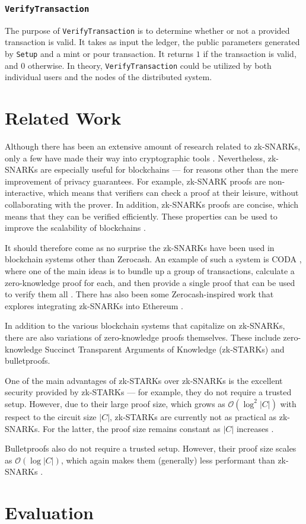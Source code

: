 \documentclass{article}
\begin{document}
\subsubsection{\texttt{VerifyTransaction}}
The purpose of \texttt{VerifyTransaction} is to determine whether or not a provided transaction is valid. It takes as input the ledger, the public parameters generated by \texttt{Setup} and a mint or pour transaction. It returns $1$ if the transaction is valid, and $0$ otherwise. In theory, \texttt{VerifyTransaction} could be utilized by both individual users and the nodes of the distributed system.

\section{Related Work}
Although there has been an extensive amount of research related to zk-SNARKs, only a few have made their way into cryptographic tools \cite{zk-snarks-blockchains-chapter}. Nevertheless, zk-SNARKs are especially useful for blockchains --- for reasons other than the mere improvement of privacy guarantees. For example, zk-SNARK proofs are non-interactive, which means that verifiers can check a proof at their leisure, without collaborating with the prover. In addition, zk-SNARKs proofs are concise, which means that they can be verified efficiently. These properties can be used to improve the scalability of blockchains \cite{zk-snarks-blockchains-chapter}.

It should therefore come as no surprise the zk-SNARKs have been used in blockchain systems other than Zerocash. An example of such a system is CODA \cite{coda}, where one of the main ideas is to bundle up a group of transactions, calculate a zero-knowledge proof for each, and then provide a single proof that can be used to verify them all \cite{zk-snarks-blockchains-chapter}. There has also been some Zerocash-inspired work that explores integrating zk-SNARKs into Ethereum \cite{zeth}.

In addition to the various blockchain systems that capitalize on zk-SNARKs, there are also variations of zero-knowledge proofs themselves. These include zero-knowledge Succinct Transparent Arguments of Knowledge (zk-STARKs) and bulletproofs.

One of the main advantages of zk-STARKs over zk-SNARKs is the excellent security provided by zk-STARKs --- for example, they do not require a trusted setup. However, due to their large proof size, which grows as $\mathcal{O}(\log^ 2{|C|})$ with respect to the circuit size $|C|$, zk-STARKs are currently not as practical as zk-SNARKs. For the latter, the proof size remains constant as $|C|$ increases \cite{zk-snarks-blockchains-chapter}.

Bulletproofs also do not require a trusted setup. However, their proof size scales as $\mathcal{O}(\log{|C|})$, which again makes them (generally) less performant than zk-SNARKs \cite{zk-snarks-blockchains-chapter}.

\section{Evaluation}

\newpage
\printbibliography
\end{document}
